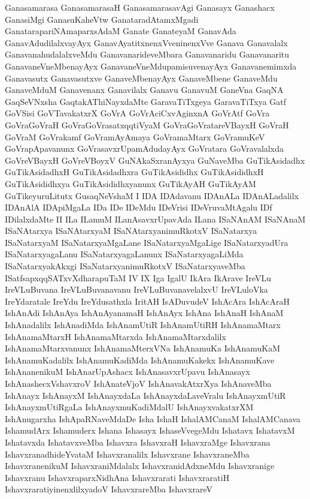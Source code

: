 {Ganasamarasa
GanasamarasaH
GanasamarasavAgi
Ganasayx
Ganashacx
GanasiMgi
GanasuKaheVtw
GanataradAtamxMgadi
GanatarapariNAmaparxsAdaM
Ganate
GanateyaM
GanavAda
GanavAdudilalxvayAyx
GanavAyatitxnenxVveninenxVve
Ganava
Ganavalalx
GanavanahudalalxveMdu
GanavanarideveMbara
Ganavanaridu
Ganavanaritu
GanavaneVneMbenayAyx
GanavaneVneMdupamisuvenayAyx
Ganavanemimxda
Ganavasutx
Ganavasutxve
GanaveMbenayAyx
GanaveMbene
GanaveMdu
GanaveMduM
Ganavenanx
Ganavilalx
Ganavu
GanavuM
GaneVna
GaqNA
GaqSeVNxsha
GaqtakAThiNayxdaMte
GaravaTiTxgeya
GaravaTiTxya
Gatf
GoVSisi
GoVTavakatxrX
GoVrA
GoVrAciCxvAginxnA
GoVrAtf
GoVra
GoVraGoVraH
GoVraGoVrasatxqqtiVyaM
GoVraGoVratareVBayxH
GoVraH
GoVraM
GoVrakamf
GoVramAyAmaya
GoVramaMtarx
GoVramuKeV
GoVrapApavanunx
GoVrasavxrUpamAdudayAyx
GoVratara
GoVravalalxda
GoVreVBayxH
GoVreVBoyxV
GuNAkaSxranAyxya
GuNaveMba
GuTikAsidadhx
GuTikAsidadhxH
GuTikAsidadhxra
GuTikAsididhx
GuTikAsididhxH
GuTikAsididhxya
GuTikAsididhxyanunx
GuTikAyAH
GuTikAyAM
GuTikeyuruLitutx
GusaqNeVshaM
I
IDA
IDAdavanu
IDAnALa
IDAnALadalilx
IDAnAlA
IDApiMgaLa
IDa
IDe
IDeMdu
IDeVrisi
IDeVruvaMtAgalu
IDf
IDilalxdaMte
II
ILa
ILamuM
ILanAsavxrUpavAda
ILana
ISaNAnAM
ISaNAnaM
ISaNAtarxya
ISaNAtarxyaM
ISaNAtarxyanimuRkotxV
ISaNatarxya
ISaNatarxyaM
ISaNatarxyaMgaLane
ISaNatarxyaMgaLige
ISaNatarxyadUra
ISaNatarxyagaLanu
ISaNatarxyagaLanunx
ISaNatarxyagaLiMda
ISaNatarxyakAkxgi
ISaNatarxyanimuRkotxV
ISaNatarxyaveMba
ISatfsapxqqSATxvXdharapuTaM
IV
IX
Iga
IgalU
IkAra
IkArave
IreVLu
IreVLuBuvana
IreVLuBuvanavanu
IreVLuBuvanavelalxvU
IreVLuloVka
IreYdaratale
IreYdu
IreYdusathxla
IritAH
IsADuvudeV
IshAcAra
IshAcAraH
IshAnAdi
IshAnAya
IshAnAyanamaH
IshAnAyx
IshAna
IshAnaH
IshAnaM
IshAnadalilx
IshAnadiMda
IshAnamUtiR
IshAnamUtiRH
IshAnamaMtarx
IshAnamaMtarxH
IshAnamaMtarxda
IshAnamaMtarxdalilx
IshAnamaMtarxvanunx
IshAnamaMterxVNa
IshAnamuKa
IshAnamuKaM
IshAnamuKadalilx
IshAnamuKadiMda
IshAnamuKakekx
IshAnamuKave
IshAnanenikuM
IshAnarUpAshacx
IshAnasavxrUpavu
IshAnasayx
IshAnashecxVshavxroV
IshAnateVjoV
IshAnavakAtxrXya
IshAnaveMba
IshAnayx
IshAnayxM
IshAnayxdaLa
IshAnayxdaLaveVralu
IshAnayxmUtiR
IshAnayxmUtiRgaLa
IshAnayxmuKadiMdalU
IshAnayxvakatxrXM
IshAnugarxha
IshApaRNaveMdaDe
Isha
IshaH
IshalAMCanaM
IshalAMCanava
IshamudArx
Ishamuderx
Ishana
Ishasayx
IshaseVvegeMdu
Ishatavx
IshatavxM
Ishatavxda
IshatavxveMba
Ishavxra
IshavxraH
IshavxraMge
Ishavxrana
IshavxranadhideYvataM
Ishavxranalilx
Ishavxrane
IshavxraneMba
IshavxranenikuM
IshavxraniMdalalx
IshavxranidAdxneMdu
Ishavxranige
Ishavxranu
IshavxraparxNidhAna
Ishavxrarati
IshavxraratiH
IshavxraratiyinenxlilxyadoV
IshavxrareMba
IshavxrareV
}

